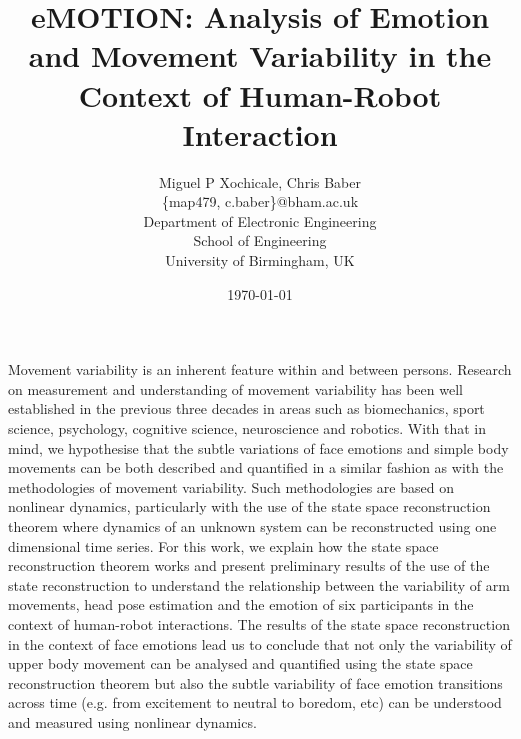 \documentclass[12pt]{article}
\author{Miguel P Xochicale, Chris Baber \\
\{map479, c.baber\}@bham.ac.uk \\
Department of Electronic Engineering\\
School of Engineering\\
University of Birmingham, UK}
\title{
eMOTION: Analysis of Emotion and Movement Variability in the Context of Human-Robot Interaction
}
\date{\today}
\begin{document}
\maketitle

Movement variability is an inherent feature within and between persons.
Research on measurement and understanding of movement variability has been well
established in the previous three decades in areas such as biomechanics,
sport science, psychology, cognitive science, neuroscience and robotics.
With that in mind, we hypothesise that the subtle variations of face emotions
and simple body movements can be both described and quantified in a similar 
fashion as with the methodologies of movement variability.
Such methodologies are based on nonlinear dynamics, particularly with the use of
the state space reconstruction theorem where dynamics of an unknown system
can be reconstructed using one dimensional time series.
For this work, we explain how the state space reconstruction theorem works and
present preliminary results of the use of the state reconstruction
to understand the relationship between the variability of arm movements, head
pose estimation and the emotion of six participants in the context of 
human-robot interactions.
The results of the state space reconstruction in the context of face emotions 
lead us to conclude that not only the variability of upper body movement 
can be analysed and quantified using the state space reconstruction theorem
but also the subtle variability of face emotion transitions across time 
(e.g. from excitement to neutral to boredom, etc)
can be understood and measured using nonlinear dynamics.
\end{document}

